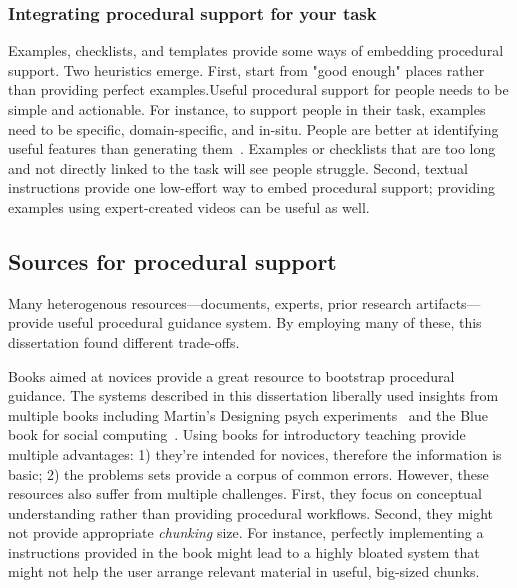 \subsubsection{Integrating procedural support for your task}
Examples, checklists, and templates provide some ways of embedding procedural support. Two heuristics emerge. First, start from "good enough" places rather than providing perfect examples.Useful procedural support for people needs to be simple and actionable. For instance, to support people in their task, examples need to be specific, domain-specific, and in-situ. People are better at identifying useful features than generating them~\cite{Stahl2006}. Examples or checklists that are too long and not directly linked to the task will see people struggle. Second, textual instructions provide one low-effort way to embed procedural support; providing examples using expert-created videos can be useful as well.

\subsection{Sources for procedural support}
Many heterogenous resources---documents, experts, prior research artifacts---provide useful procedural guidance system. By employing many of these, this dissertation found different trade-offs.

Books aimed at novices provide a great resource to bootstrap procedural guidance. The systems described in this dissertation liberally used insights from multiple books including Martin’s Designing psych experiments~\cite{Martin2007} and the Blue book for social computing~\cite{Resnick2011}. Using books for introductory teaching provide multiple advantages: 1) they're intended for novices, therefore the information is basic; 2) the problems sets provide a corpus of common errors. However, these resources also suffer from multiple challenges. First, they focus on conceptual understanding rather than providing procedural workflows. Second, they might not provide appropriate \textit{chunking} size. For instance, perfectly implementing a instructions provided in the book might lead to a highly bloated system that might not help the user arrange relevant material in useful, big-sized chunks. 

